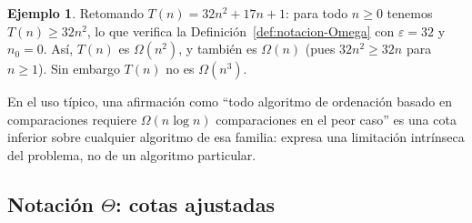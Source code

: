 \documentclass[12pt, spanish, oneside, openany]{book}
\theoremstyle{uprightplain}
\theoremstyle{definition}
\newtheorem{ejemplo}[teorema]{Ejemplo}
\theoremstyle{remark}
\theoremstyle{definition}
\begin{document}
\begin{ejemplo}
\label{ej:Omega-cuadratico}
Retomando $T(n)=32n^2+17n+1$: para todo $n\ge 0$ tenemos $T(n)\ge 32n^2$, lo que verifica la Definición~\ref{def:notacion-Omega} con $\varepsilon=32$ y $n_0=0$. Así, $T(n)$ es $\Omega(n^2)$, y también es $\Omega(n)$ (pues $32n^2\ge 32n$ para $n\ge 1$). Sin embargo $T(n)$ no es $\Omega(n^3)$.
\end{ejemplo}

En el uso típico, una afirmación como ``todo algoritmo de ordenación basado en comparaciones requiere $\Omega(n\log n)$ comparaciones en el peor caso'' es una cota inferior sobre cualquier algoritmo de esa familia: expresa una limitación intrínseca del problema, no de un algoritmo particular.

\subsection{Notación $\Theta$: cotas ajustadas}
\end{document}
